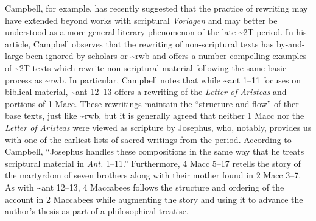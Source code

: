 Campbell, for example, has recently suggested that the practice of
rewriting may have extended beyond works with scriptural \emph{Vorlagen}
and may better be understood as a more general literary phenomenon of
the late \textasciitilde{}2T period.\autocite{campbell_zsengeller2014}
In his article, Campbell observes that the rewriting of non-scriptural
texts has by-and-large been ignored by scholars or \textasciitilde{}rwb
and offers a number compelling examples of \textasciitilde{}2T texts
which rewrite non-scriptural material following the same basic process
as \textasciitilde{}rwb. In particular, Campbell notes that while
\textasciitilde{}ant 1--11 focuses on biblical material,
\textasciitilde{}ant 12--13 offers a rewriting of the \emph{Letter of
Aristeas} and portions of 1 Macc. These rewritings maintain the
``structure and flow'' of ther base texts, just like
\textasciitilde{}rwb, but it is generally agreed that neither 1 Macc nor
the \emph{Letter of Aristeas} were viewed as scripture by Josephus, who,
notably, provides us with one of the earliest lists of sacred writings
from the period.\autocite{mason2002_mcdonald-sanders2002} According to
Campbell, ``Josephus handles these compositions in the same way that he
treats scriptural material in \emph{Ant.}
1--11.''\autocites[70]{campbell_zsengeller2014}[See
also][126]{mason2002_mcdonald-sanders2002} Furthermore, 4 Macc 5--17
retells the story of the martyrdom of seven brothers along with their
mother found in 2 Macc 3--7. As with \textasciitilde{}ant 12--13, 4
Maccabees follows the structure and ordering of the account in 2
Maccabees while augmenting the story and using it to advance the
author's thesis as part of a philosophical treatise.


